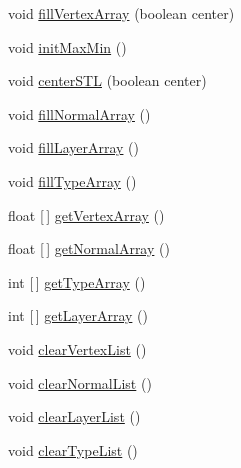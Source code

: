 \begin{DoxyCompactItemize}
\item 
void \hyperlink{classandroid_1_1app_1_1printerapp_1_1viewer_1_1_data_storage_ac333a3d782c579c585e657f64ffd6609}{fill\+Vertex\+Array} (boolean center)
\item 
void \hyperlink{classandroid_1_1app_1_1printerapp_1_1viewer_1_1_data_storage_a3e3588a0399d8c867faa48f89cb3f207}{init\+Max\+Min} ()
\item 
void \hyperlink{classandroid_1_1app_1_1printerapp_1_1viewer_1_1_data_storage_a169f2744bf07610131b35821c424e6f3}{center\+S\+TL} (boolean center)
\item 
void \hyperlink{classandroid_1_1app_1_1printerapp_1_1viewer_1_1_data_storage_a38d3b54eef85f5873df940d23b7d4d58}{fill\+Normal\+Array} ()
\item 
void \hyperlink{classandroid_1_1app_1_1printerapp_1_1viewer_1_1_data_storage_af90b7f65559adedaa6f9df8c71b8f0cc}{fill\+Layer\+Array} ()
\item 
void \hyperlink{classandroid_1_1app_1_1printerapp_1_1viewer_1_1_data_storage_abbd3e1edc6e0eecb7cf56afa38178c4b}{fill\+Type\+Array} ()
\item 
float \mbox{[}$\,$\mbox{]} \hyperlink{classandroid_1_1app_1_1printerapp_1_1viewer_1_1_data_storage_ab5fd6ed96dda303c97e4f7f29a983734}{get\+Vertex\+Array} ()
\item 
float \mbox{[}$\,$\mbox{]} \hyperlink{classandroid_1_1app_1_1printerapp_1_1viewer_1_1_data_storage_a5af355796cd5cacfe1b09c96db743d5f}{get\+Normal\+Array} ()
\item 
int \mbox{[}$\,$\mbox{]} \hyperlink{classandroid_1_1app_1_1printerapp_1_1viewer_1_1_data_storage_ae9986837811a89598403facaf3429a76}{get\+Type\+Array} ()
\item 
int \mbox{[}$\,$\mbox{]} \hyperlink{classandroid_1_1app_1_1printerapp_1_1viewer_1_1_data_storage_a627eba7fc1485cb760556730c1674ed7}{get\+Layer\+Array} ()
\item 
void \hyperlink{classandroid_1_1app_1_1printerapp_1_1viewer_1_1_data_storage_aa2382e64887269a5ffcc0c590e6dcce0}{clear\+Vertex\+List} ()
\item 
void \hyperlink{classandroid_1_1app_1_1printerapp_1_1viewer_1_1_data_storage_a165ec727e39761dc10603bc340630854}{clear\+Normal\+List} ()
\item 
void \hyperlink{classandroid_1_1app_1_1printerapp_1_1viewer_1_1_data_storage_ad7ebb97a46187662b926f984635bf0bc}{clear\+Layer\+List} ()
\item 
void \hyperlink{classandroid_1_1app_1_1printerapp_1_1viewer_1_1_data_storage_a7fc062b4fc1d383283b32c928f8fb707}{clear\+Type\+List} ()

\end{DoxyCompactItemize}
